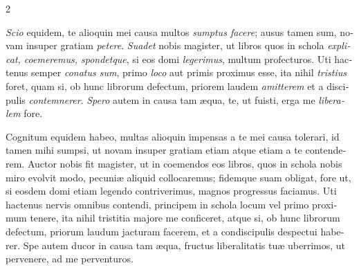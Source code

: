 \begin{otherlanguage}{french}
\begin{multicols}{2}
\end{multicols}
\noindent\begin{minipage}[t]{0.48\textwidth}\small
\textit{Scio} equidem, te alioquin mei causa multos \textit{sumptus facere}; ausus tamen sum, novam insuper gratiam \textit{petere}. \textit{Suadet} nobis magister, ut libros quos in schola \textit{explicat, coemeremus, spondetque}, si eos domi \textit{legerimus}, multum profecturos. Uti hactenus semper \textit{conatus sum}, primo \textit{loco} aut primis proximus esse, ita nihil \textit{tristius} foret, quam si, ob hunc librorum defectum, priorem laudem \textit{amitterem} et a discipulis \textit{contemnerer}. \textit{Spero} autem in causa tam æqua, te, ut fuisti, erga me \textit{liberalem} fore.


\end{minipage}\hfill
\begin{minipage}[t]{0.48\textwidth}\small
Cognitum equidem habeo, multas alioquin impensas a te mei causa tolerari, id tamen mihi sumpsi, ut novam insuper gratiam etiam atque etiam a te contenderem. Auctor nobis fit magister, ut in coemendos eos libros, quos in schola nobis miro evolvit modo, pecuniæ aliquid collocaremus; fidemque suam obligat, fore ut, si eosdem domi etiam legendo contriverimus, magnos progressus faciamus. Uti hactenus nervis omnibus contendi, principem in schola locum vel primo proximum tenere, ita nihil tristitia majore me conficeret, atque si, ob hunc librorum defectum, priorum laudum jacturam facerem, et a condiscipulis despectui haberer. Spe autem ducor in causa tam æqua, fructus liberalitatis tuæ uberrimos, ut pervenere, ad me perventuros.


\end{minipage}


\end{otherlanguage}
